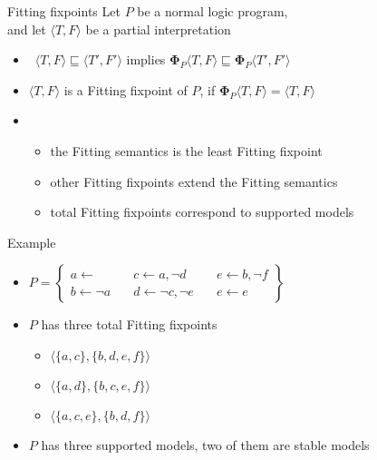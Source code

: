 \begin{frame}{Fitting fixpoints}
  \bigskip
  Let $P$ be a normal logic program,\\ and
  let $\langle T,F \rangle$ be a partial interpretation
  \medskip
  \begin{itemize}
  \item<1->  \
    $\langle T,F \rangle\sqsubseteq\langle T',F' \rangle$
    implies
    ${\mathbf{\Phi}}_P\langle T,F \rangle\sqsubseteq{\mathbf{\Phi}}_P\langle T',F' \rangle$
    \smallskip
  \item<1->
    $\langle T,F \rangle$ is a \alert{Fitting fixpoint} of $P$,
    if
    ${\mathbf{\Phi}}_P\langle T,F \rangle = \langle T,F \rangle$
  \smallskip
  \item<2-> []
    \begin{itemize}\normalsize
    \item the Fitting semantics is the least Fitting fixpoint
      \smallskip
    \item other Fitting fixpoints extend the Fitting semantics
      \smallskip
    \item total Fitting fixpoints correspond to supported models
    \end{itemize}
  \end{itemize}
\end{frame}
\begin{frame}{Example}
  \bigskip
  \begin{itemize}
  \item<1->
    \(
    P
    =
    \left\{
      \begin{array}{lll}
        a \leftarrow                \quad &
        c \leftarrow a, \neg d      \quad &
        e \leftarrow b, \neg f
        \\
        b \leftarrow \neg a         \quad &
        d \leftarrow \neg c, \neg e \quad &
        e \leftarrow e
      \end{array}
    \right\}
    \)
    \bigskip
  \item<2-> $P$ has three total Fitting fixpoints
    \smallskip
    \begin{itemize}\normalsize
    \item<3-> $\langle \{a,c\},  \{b,d,e,f\} \rangle$
    \item<3-> $\langle \{a,d\},  \{b,c,e,f\} \rangle$
    \item<3-> $\langle \{a,c,e\},\{b,d,f\}   \rangle$
    \end{itemize}
    \medskip
  \item <4-> $P$ has three supported models, two of them are stable models
  \end{itemize}
\end{frame}
